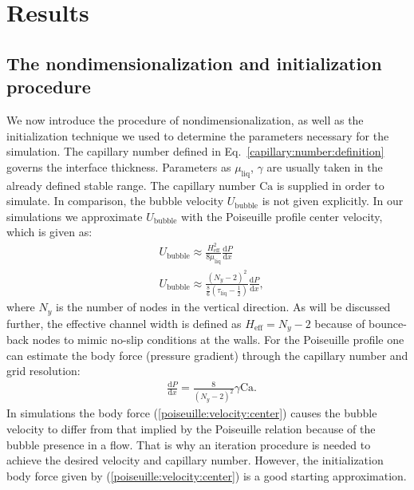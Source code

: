 \documentclass[preprint,12pt]{elsarticle}
\newcommand{\Ca}{\mathrm{Ca}}
\begin{document}
\section{Results}
\subsection{The nondimensionalization and initialization procedure}
\label{section:init}
We now introduce the procedure of nondimensionalization, as well as
the initialization technique we used to determine the parameters necessary for
the simulation. The capillary number defined in Eq.~\ref{capillary:number:definition} governs the
interface thickness.
{\color{red} Parameters as $\mu_{\mathrm{liq}}$, $\gamma$ are usually taken in the already defined
stable range. The capillary number $\Ca$ is supplied in order to simulate.} 
In comparison, the bubble
velocity $U_{\mathrm{bubble}}$ is not given
explicitly.
In our simulations we approximate $U_{\mathrm{bubble}}$ with the
Poiseuille profile center velocity, which is given as:
\begin{equation}
\begin{aligned}
&U_{\mathrm{bubble}} \approx \frac{H_{\mathrm{eff}}^2}{8
\mu_{\mathrm{liq}}}\frac{\mathrm{d}P}{\mathrm{d}x}\\
&U_{\mathrm{bubble}}\approx
\frac{{(N_y-2)}^2}{\frac{8}{6}(\tau_{\mathrm{liq}}-\frac{1}{2})}\frac{\mathrm{d}P}{\mathrm{d}
x } ,
\end{aligned}
\end{equation}
where $N_y$ is the number of nodes in the vertical direction. As will be discussed further, the
effective channel width is defined as $H_{\mathrm{eff}}=N_y-2$ because of bounce-back nodes to
mimic no-slip conditions at the walls.
For the Poiseuille profile one can estimate the body force (pressure gradient) through the
capillary number and grid resolution:
\begin{equation}
\label{poiseuille:velocity:center}
\begin{aligned}
&\frac{\mathrm{d}P}{\mathrm{d}x}=\frac{8}{{(N_y-2)}^2}\gamma \Ca.
\end{aligned}
\end{equation}
In simulations the body force (\ref{poiseuille:velocity:center}) causes the bubble
velocity to differ from that implied by the Poiseuille relation because of the bubble presence in a
flow. That is
why an iteration procedure is needed to achieve the 
desired velocity and 
capillary number. 
However, the initialization body force given by (\ref{poiseuille:velocity:center}) is a good
starting approximation. 
\end{document}
